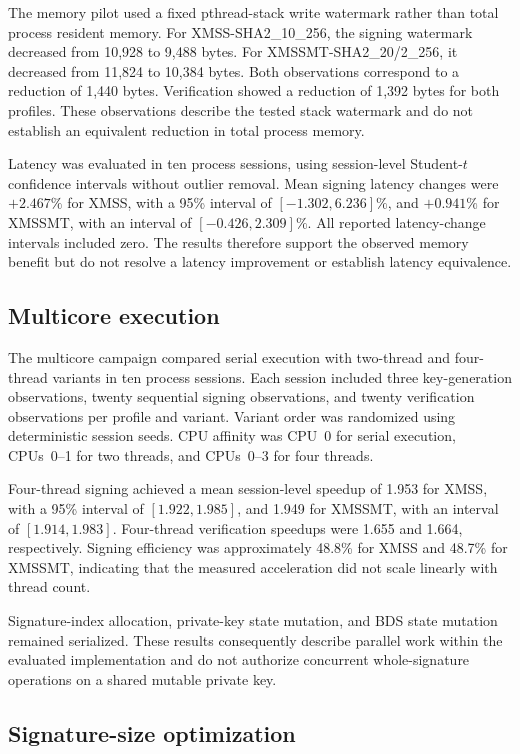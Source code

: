 \documentclass[pdflatex,sn-mathphys-num]{sn-jnl}
\begin{document}
The memory pilot used a fixed pthread-stack write watermark rather than
total process resident memory. For XMSS-SHA2\_10\_256, the signing
watermark decreased from 10,928 to 9,488 bytes. For
XMSSMT-SHA2\_20/2\_256, it decreased from 11,824 to 10,384 bytes.
Both observations correspond to a reduction of 1,440 bytes. Verification
showed a reduction of 1,392 bytes for both profiles. These observations
describe the tested stack watermark and do not establish an equivalent
reduction in total process memory.

Latency was evaluated in ten process sessions, using session-level
Student-$t$ confidence intervals without outlier removal. Mean signing
latency changes were $+2.467\%$ for XMSS, with a 95\% interval of
$[-1.302,6.236]\%$, and $+0.941\%$ for XMSSMT, with an interval of
$[-0.426,2.309]\%$. All reported latency-change intervals included zero.
The results therefore support the observed memory benefit but do not
resolve a latency improvement or establish latency equivalence.

\subsection{Multicore execution}
\label{subsec:o6_multicore_review}

The multicore campaign compared serial execution with two-thread and
four-thread variants in ten process sessions. Each session included
three key-generation observations, twenty sequential signing
observations, and twenty verification observations per profile and
variant. Variant order was randomized using deterministic session
seeds. CPU affinity was CPU~0 for serial execution, CPUs~0--1 for two
threads, and CPUs~0--3 for four threads.

Four-thread signing achieved a mean session-level speedup of 1.953
for XMSS, with a 95\% interval of $[1.922,1.985]$, and 1.949 for
XMSSMT, with an interval of $[1.914,1.983]$. Four-thread verification
speedups were 1.655 and 1.664, respectively. Signing efficiency was
approximately 48.8\% for XMSS and 48.7\% for XMSSMT, indicating that
the measured acceleration did not scale linearly with thread count.

Signature-index allocation, private-key state mutation, and BDS state
mutation remained serialized. These results consequently describe
parallel work within the evaluated implementation and do not authorize
concurrent whole-signature operations on a shared mutable private key.

\subsection{Signature-size optimization}
\label{subsec:signature_size}
\end{document}
